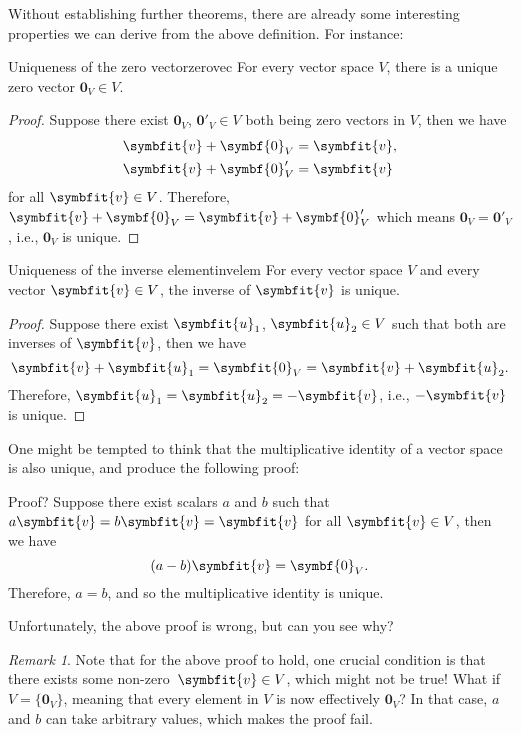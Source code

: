 \documentclass[math]{amznotes}
\theoremstyle{remark}
\newtheorem*{remark}{Remark}
\begin{document}
Without establishing further theorems, there are already some interesting properties we can derive from the above definition. For instance:
\begin{thmbox}{Uniqueness of the zero vector}{zerovec}
    For every vector space $V$, there is a unique zero vector $\symbf{0}_V \in V$.
    \tcblower
    \begin{proof}
        Suppose there exist $\symbf{0}_V$, $\symbf{0}'_V \in V$ both being zero vectors in $V$, then we have
        \begin{align*}
            \symbfit{v} + \symbf{0}_V  & = \symbfit{v}, \\
            \symbfit{v} + \symbf{0}'_V & = \symbfit{v}
        \end{align*}
        for all $\symbfit{v} \in V$. Therefore, $\symbfit{v} + \symbf{0}_V = \symbfit{v} + \symbf{0}'_V$ which means $\symbf{0}_V = \symbf{0}'_V$, i.e., $\symbf{0}_V$ is unique.
    \end{proof}
\end{thmbox}
\begin{thmbox}{Uniqueness of the inverse element}{invelem}
    For every vector space $V$ and every vector $\symbfit{v} \in V$, the inverse of $\symbfit{v}$ is unique.
    \tcblower
    \begin{proof}
        Suppose there exist $\symbfit{u}_1$, $\symbfit{u}_2 \in V$ such that both are inverses of $\symbfit{v}$, then we have
        \begin{equation*}
            \symbfit{v} + \symbfit{u}_1 = \symbfit{0}_V = \symbfit{v} + \symbfit{u}_2.
        \end{equation*}
        Therefore, $\symbfit{u}_1 = \symbfit{u}_2 = -\symbfit{v}$, i.e., $-\symbfit{v}$ is unique.
    \end{proof}
\end{thmbox}
One might be tempted to think that the multiplicative identity of a vector space is also unique, and produce the following proof:
\begin{genbox}{Proof?}
    Suppose there exist scalars $a$ and $b$ such that $a\symbfit{v} = b\symbfit{v} = \symbfit{v}$ for all $\symbfit{v} \in V$, then we have
    \begin{equation*}
        (a - b)\symbfit{v} = \symbf{0}_V.
    \end{equation*}
    Therefore, $a = b$, and so the multiplicative identity is unique.
\end{genbox}
Unfortunately, the above proof is wrong, but can you see why?
\begin{notebox}
    \begin{remark}
        Note that for the above proof to hold, one crucial condition is that there exists some non-zero~$\symbfit{v} \in V$, which might not be true! What if $V = \{\symbf{0}_V\}$, meaning that every element in $V$ is now effectively $\symbf{0}_V$? In that case, $a$ and $b$ can take arbitrary values, which makes the proof fail.
    \end{remark}
\end{notebox}
\end{document}
